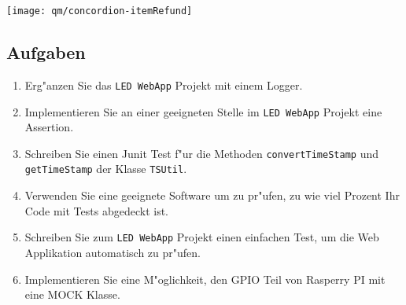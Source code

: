 \begin{centering}
\texttt{[image: qm/concordion-itemRefund]}
\end{centering}
%

\subsection{Aufgaben}
\begin{enumerate}
\item Erg"anzen Sie das \verb|LED WebApp| Projekt mit einem Logger.
\item Implementieren Sie an einer geeigneten Stelle im \verb|LED WebApp| Projekt
eine Assertion.
\item Schreiben Sie einen Junit Test f"ur die Methoden \verb|convertTimeStamp| und
\verb|getTimeStamp| der Klasse \verb|TSUtil|.
\item Verwenden Sie eine geeignete Software um zu pr"ufen, zu wie viel Prozent Ihr
Code mit Tests abgedeckt ist.
\item Schreiben Sie zum \verb|LED WebApp| Projekt einen einfachen Test, um die Web Applikation
automatisch zu pr"ufen.
\item Implementieren Sie eine M"oglichkeit, den GPIO Teil von Rasperry PI mit eine MOCK Klasse.
\end{enumerate}

\newslide
